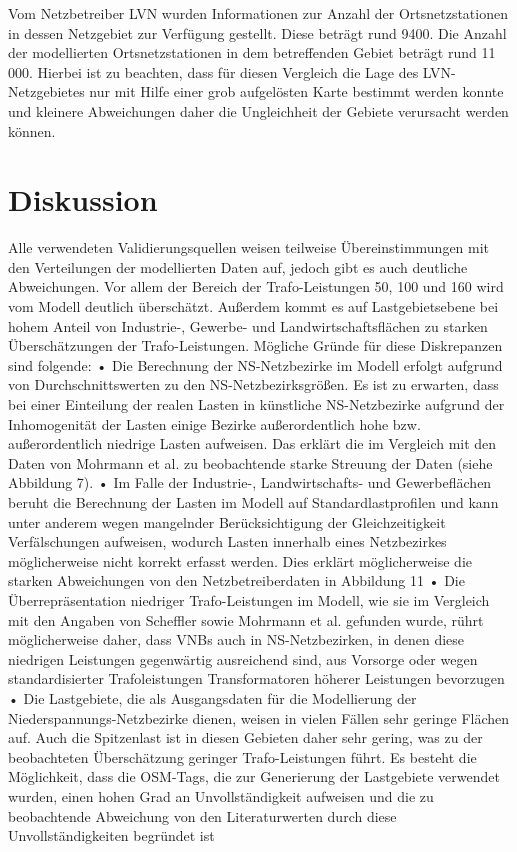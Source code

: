 \documentclass[11pt]{scrreprt}
\begin{document}
Vom Netzbetreiber LVN wurden Informationen zur Anzahl der Ortsnetzstationen in dessen Netzgebiet zur Verfügung gestellt. Diese beträgt rund 9400. Die Anzahl der modellierten Ortsnetzstationen in dem betreffenden Gebiet beträgt rund 11 000. Hierbei ist zu beachten, dass für diesen Vergleich die Lage des LVN-Netzgebietes nur mit Hilfe einer grob aufgelösten Karte bestimmt werden konnte und kleinere Abweichungen daher die Ungleichheit der Gebiete verursacht werden können. 

\chapter{Diskussion}
\label{sec:Diskussion}

Alle verwendeten Validierungsquellen weisen teilweise Übereinstimmungen mit den Verteilungen der modellierten Daten auf, jedoch gibt es auch deutliche Abweichungen. Vor allem der Bereich der Trafo-Leistungen 50, 100 und 160 wird vom Modell deutlich überschätzt. Außerdem kommt es auf Lastgebietsebene bei hohem Anteil von Industrie-, Gewerbe- und Landwirtschaftsflächen zu starken Überschätzungen der Trafo-Leistungen. Mögliche Gründe für diese Diskrepanzen sind folgende:
•	Die Berechnung der NS-Netzbezirke im Modell erfolgt aufgrund von Durchschnittswerten zu den NS-Netzbezirksgrößen. Es ist zu erwarten, dass bei einer Einteilung der realen Lasten in künstliche NS-Netzbezirke aufgrund der Inhomogenität der Lasten einige Bezirke außerordentlich hohe bzw. außerordentlich niedrige Lasten aufweisen. Das erklärt die im Vergleich mit den Daten von Mohrmann et al. zu beobachtende starke Streuung der Daten (siehe Abbildung 7).
•	Im Falle der Industrie-, Landwirtschafts- und Gewerbeflächen beruht die Berechnung der Lasten im Modell auf Standardlastprofilen und kann unter anderem wegen mangelnder Berücksichtigung der Gleichzeitigkeit Verfälschungen aufweisen, wodurch Lasten innerhalb eines Netzbezirkes möglicherweise nicht korrekt erfasst werden. Dies erklärt möglicherweise die starken Abweichungen von den Netzbetreiberdaten in Abbildung 11
•	Die Überrepräsentation niedriger Trafo-Leistungen im Modell, wie sie im Vergleich mit den Angaben von Scheffler sowie Mohrmann et al. gefunden wurde, rührt möglicherweise daher, dass VNBs auch in NS-Netzbezirken, in denen diese niedrigen Leistungen gegenwärtig ausreichend sind, aus Vorsorge oder wegen standardisierter Trafoleistungen Transformatoren höherer Leistungen bevorzugen
•	Die Lastgebiete, die als Ausgangsdaten für die Modellierung der Niederspannungs-Netzbezirke dienen, weisen in vielen Fällen sehr geringe Flächen auf. Auch die Spitzenlast ist in diesen Gebieten daher sehr gering, was zu der beobachteten Überschätzung geringer Trafo-Leistungen führt. Es besteht die Möglichkeit, dass die OSM-Tags, die zur Generierung der Lastgebiete verwendet wurden, einen hohen Grad an Unvollständigkeit aufweisen und die zu beobachtende Abweichung von den Literaturwerten durch diese Unvollständigkeiten begründet ist
\end{document}
